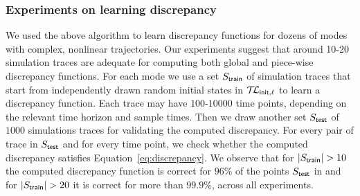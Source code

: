 %
%
%
%
\vspace{-10pt}
\subsubsection{Experiments on learning discrepancy}

We used the above algorithm to learn discrepancy functions for dozens
of modes with complex, nonlinear trajectories.  Our experiments
suggest that around 10-20 simulation traces are adequate for computing
both global and piece-wise discrepancy functions. For each mode we use
a set $S_{\sf train}$ of simulation traces that start from
independently drawn random initial states in $\mathcal{T\mkern-3mu L}_{\sf init,\ell}$ to
learn a discrepancy function.  Each trace may have $100$-$10000$ time
points, depending on the relevant time horizon and sample times.  Then
we draw another set $S_{\sf test}$ of $1000$ simulations traces for
validating the computed discrepancy. For every pair of trace in
$S_{\sf test}$ and for every time point, we check whether the computed
discrepancy satisfies Equation~\ref{eq:discrepancy}.  We 
observe that for $|S_{\sf train}| > 10$ the computed discrepancy
function is correct for $96\%$ of the points $S_{\sf test}$ in and for
$|S_{\sf train}| > 20$ it is correct for more than $99.9\%$, across all experiments.

